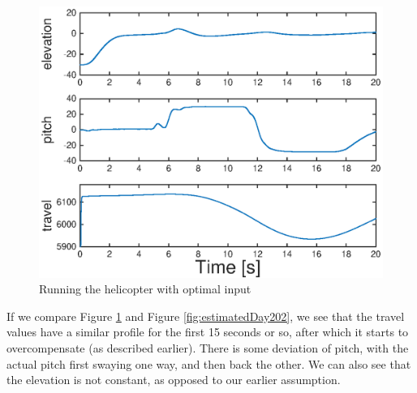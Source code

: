 \begin{figure}[H]
	\centering
	\includegraphics[width=\textwidth]{day2}
	\caption{Running the helicopter with optimal input}
	\label{fig:day2}
\end{figure}

If we compare Figure \ref{fig:day2} and Figure \ref{fig:estimatedDay202}, we see that the travel values have a similar profile for the first 15 seconds or so, after which it starts to overcompensate (as described earlier). There is some deviation of pitch, with the actual pitch first swaying one way, and then back the other. We can also see that the elevation is not constant, as opposed to our earlier assumption.